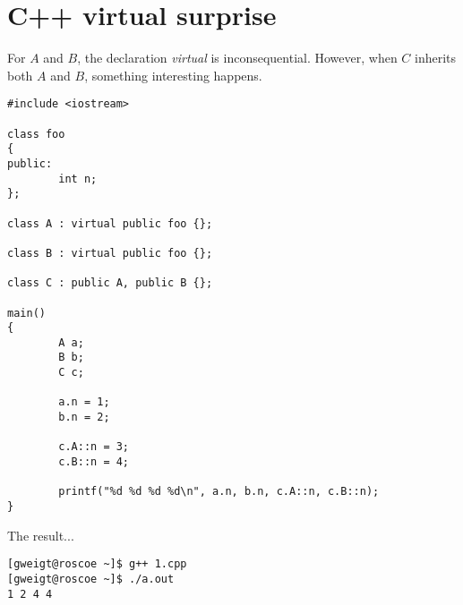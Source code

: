 \documentclass{article}
\begin{document}
\section*{C++ virtual surprise}

For $A$ and $B$, the declaration {\it virtual} is inconsequential.
However, when $C$ inherits both $A$ and $B$, something interesting happens.

\medskip
\begin{verbatim}
#include <iostream>

class foo
{
public:
        int n;
};

class A : virtual public foo {};

class B : virtual public foo {};

class C : public A, public B {};

main()
{
        A a;
        B b;
        C c;

        a.n = 1;
        b.n = 2;

        c.A::n = 3;
        c.B::n = 4;

        printf("%d %d %d %d\n", a.n, b.n, c.A::n, c.B::n);
}
\end{verbatim}

\medskip
\noindent
The result...

\medskip
\begin{verbatim}
[gweigt@roscoe ~]$ g++ 1.cpp
[gweigt@roscoe ~]$ ./a.out
1 2 4 4
\end{verbatim}
\end{document}
